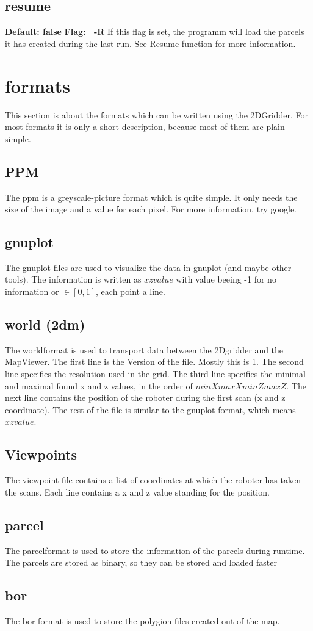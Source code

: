 \documentclass{article}
\begin{document}
\subsection{resume}
{\bf Default: false} \newline
{\bf Flag: \ -R} \newline
If this flag is set, the programm will load the parcels it has created
during the last run. See Resume-function for more information.

\section{formats}
This section is about the formats which can be written using the
2DGridder. For most formats it is only a short description, because most of
them are plain simple.

\subsection{PPM}
The ppm is a greyscale-picture format which is quite simple. It only needs the
size of the image and a value for each pixel. For more information, try google.

\subsection{gnuplot}
The gnuplot files are used to visualize the data in gnuplot (and maybe other
tools). The information is written as $x z value$ with value beeing -1 for no
information or $\in[0,1]$, each point a line.

\subsection{world (2dm)}
The worldformat is used to transport data between the 2Dgridder and the
MapViewer. The first line is the Version of the file. Mostly this is 1. The
second line specifies the resolution used in the grid. The third line specifies
the minimal and maximal found x and z values, in the order of $minX maxX minZ
maxZ$. The next line contains the position of the roboter during the first
scan (x and z coordinate). The rest of the file is similar to the gnuplot
format, which means $x z value$.

\subsection{Viewpoints}
The viewpoint-file contains a list of coordinates at which the roboter has
taken the scans. Each line contains a x and z value standing for the position.

\subsection{parcel}
The parcelformat is used to store the information of the parcels during
runtime. The parcels are stored as binary, so they can be stored and loaded
faster

\subsection{bor}
The bor-format is used to store the polygion-files created out of the map.
\end{document}
